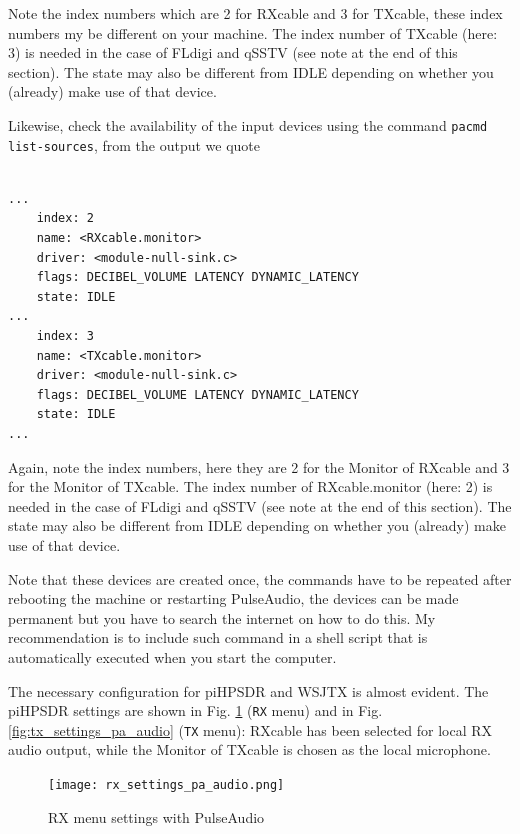 \documentclass[12pt]{book}
\def\bltt#1{\texttt{\color{blue}#1}}
\def\pH{pi\-HPSDR\xspace}
\begin{document}
Note the index numbers which are 2 for RXcable and 3 for TXcable, these index numbers my
be different on your machine. The index number of TXcable (here: 3) is needed in the
case of FLdigi and qSSTV (see note at the end of this section).
The state may also be different from IDLE depending on whether
you (already) make use of that device.

Likewise, check the availability of the input devices using
the command \texttt{pacmd list-sources}, from the output we quote

\begin{small}
\begin{verbatim}

...
    index: 2
	name: <RXcable.monitor>
	driver: <module-null-sink.c>
	flags: DECIBEL_VOLUME LATENCY DYNAMIC_LATENCY
	state: IDLE
...
    index: 3
	name: <TXcable.monitor>
	driver: <module-null-sink.c>
	flags: DECIBEL_VOLUME LATENCY DYNAMIC_LATENCY
	state: IDLE
...
\end{verbatim}
\end{small}

Again, note the index numbers, here they are 2 for the Monitor of RXcable and 3 for the Monitor
of TXcable. The index number of RXcable.monitor (here: 2) is needed in the
case of FLdigi and qSSTV (see note at the end of this section).
The state may also be different from IDLE depending on whether
you (already) make use of that device.

Note that these devices are created once, the commands have to be repeated after rebooting
the machine or restarting PulseAudio, the devices can be made permanent but you have to
search the internet on how to do this. My recommendation is to include such command in a
shell script that is automatically executed when you start the computer.

The necessary configuration for \pH and WSJTX is  almost evident. The
\pH settings are shown in Fig. \ref{fig:rx_settings_pa_audio} (\bltt{RX} menu)
and in Fig. \ref{fig:tx_settings_pa_audio} (\bltt{TX} menu): RXcable has been selected
for local RX audio output, while the Monitor of TXcable is chosen as the local
microphone.

\begin{figure}[ht]
\center
\texttt{[image: rx\_settings\_pa\_audio.png]}
\caption{RX menu settings with PulseAudio}
\label{fig:rx_settings_pa_audio}
\end{figure}
\end{document}
